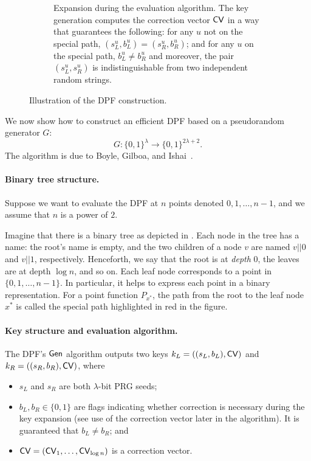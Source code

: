 \begin{figure}[t]
\begin{subfigure}{0.48\textwidth}
        \caption{Expansion during the evaluation algorithm.
The key generation computes the correction vector ${\sf CV}$ 
in a way that guarantees the following: 
for any $u$ not on the special
path, $(s_L^u, b_L^u) = (s_R^u, b_R^u)$;
and for any $u$ on the special path, 
$b_L^u \neq b_R^u$ and moreover,
the pair $(s_L^u, s_R^u)$ is indistinguishable
from two independent random strings.
}
\label{fig:expand}
    \end{subfigure}
     \caption{Illustration of the DPF construction.\label{fig:dpf-demo}}
\end{figure}





We now show how to construct an efficient DPF based on a pseudorandom
generator $G$:
 $$G: \{0,1\}^{\lambda} \rightarrow  \{0,1\}^{2\lambda + 2}. $$
The algorithm is due to 
Boyle, Gilboa, and Ishai~\cite{boyle2016function}.

\paragraph{Binary tree structure.}
Suppose we want to evaluate the DPF
at $n$ points denoted $0, 1, \ldots,  n-1$,
and we assume that $n$ is a power of $2$.

Imagine that there is a binary tree
as depicted in .
Each node in the tree has a name:  
the root's name is empty, and the two children of a node $v$ 
are named $v||0$ and $v||1$, respectively.
Henceforth, we say that the root is at {\it depth} $0$, the leaves
are at depth $\log n$, and so on.
Each leaf node corresponds to a point in 
$\{0, 1, \ldots, n-1\}$. In particular, it helps to express
each point in a binary representation.
For a point function $P_{x^*}$, 
the path from the root to the leaf node $x^*$ 
is called the special path highlighted in {\color{red}red}
in the figure. 

\paragraph{Key structure and evaluation algorithm.}
The DPF's ${\sf Gen}$ algorithm outputs two keys
$k_L = ((s_L, b_L), {{\sf CV}})$ and $k_R = ((s_R, b_R), {{\sf CV}})$,
where 
\begin{itemize}[leftmargin=7mm]
\item $s_L$ and $s_R$ are both $\lambda$-bit PRG seeds;
\item 
$b_L, b_R\in \{0, 1\}$ are flags indicating whether 
correction is necessary during the key expansion (see use
of the correction vector later in the algorithm). It
is guaranteed that $b_L \neq b_R$; 
and 
\item 
${\sf CV} = ({\sf CV}_1, \ldots, {\sf CV}_{\log n})$ 
is a correction vector.
\end{itemize}


